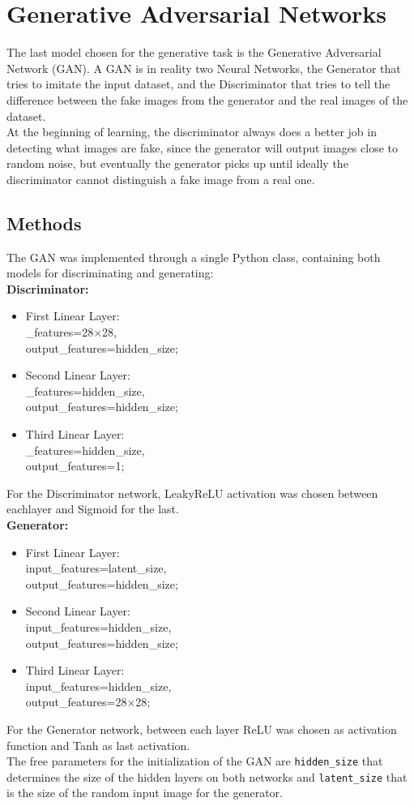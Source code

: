 \documentclass[11pt,a4paper,twocolumn]{IEEEtran}
\begin{document}
	\section{\textbf{Generative Adversarial Networks}}
		The last model chosen for the generative task is the Generative Adversarial Network (GAN). A GAN is in reality two Neural Networks, the Generator that tries to imitate the input dataset, and the Discriminator that tries to tell the difference between the fake images from the generator and the real images of the dataset.\\
		At the beginning of learning, the discriminator always does a better job in detecting what images are fake, since the generator will output images close to random noise, but eventually the generator picks up until ideally the discriminator cannot distinguish a fake image from a real one.
		\subsection{\textbf{Methods}}
		The GAN was implemented through a single Python class, containing both models for discriminating and generating:\\
		\textbf{Discriminator:}
		\begin{itemize}
			\item First Linear Layer: \\_features=28$\times$28,\\ output\_features=hidden\_size;
			\item Second Linear Layer: \\_features=hidden\_size,\\ output\_features=hidden\_size;
			\item Third Linear Layer: \\_features=hidden\_size,\\ output\_features=1;
		\end{itemize}
		For the Discriminator network, LeakyReLU activation was chosen between eachlayer and Sigmoid for the last.\\
		\textbf{Generator:}
		\begin{itemize}
			\item First Linear Layer:\\ input\_features=latent\_size,\\ output\_features=hidden\_size;
			\item Second Linear Layer:\\ input\_features=hidden\_size,\\ output\_features=hidden\_size;
			\item Third Linear Layer:\\ input\_features=hidden\_size,\\ output\_features=28$\times$28;
		\end{itemize}
		For the Generator network, between each layer ReLU was chosen as activation function and Tanh as last activation.\medskip\\
		The free parameters for the initialization of the GAN are \texttt{hidden\_size} that determines the size of the hidden layers on both networks and \texttt{latent\_size} that is the size of the random input image for the generator.
\end{document}
